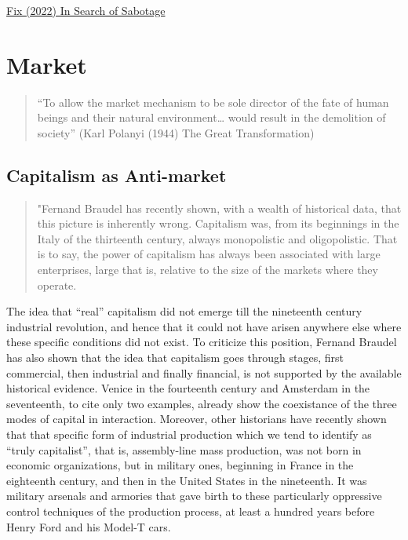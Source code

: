 \documentclass[
]{book}
\begin{document}
\href{https://economicsfromthetopdown.com/2022/03/11/in-search-of-sabotage/}{Fix (2022) In Search of Sabotage}

\hypertarget{market}{%
\chapter{Market}\label{market}}

\begin{quote}
``To allow the market mechanism to be sole director of the fate of human
beings and their natural environment\ldots{} would result in the demolition of
society'' (Karl Polanyi (1944) The Great Transformation)
\end{quote}

\hypertarget{capitalism-as-anti-market}{%
\section{Capitalism as Anti-market}\label{capitalism-as-anti-market}}

\begin{quote}
"Fernand Braudel has recently shown, with a wealth of historical data, that this picture is inherently wrong. Capitalism was, from its beginnings in the Italy of the thirteenth century, always monopolistic and oligopolistic. That is to say, the power of capitalism has always been associated with large enterprises, large that is, relative to the size of the markets where they operate.
\end{quote}

The idea that ``real'' capitalism did not emerge till the nineteenth century industrial revolution, and hence that it could not have arisen anywhere else where these specific conditions did not exist. To criticize this position, Fernand Braudel has also shown that the idea that capitalism goes through stages, first commercial, then industrial and finally financial, is not supported by the available historical evidence. Venice in the fourteenth century and Amsterdam in the seventeenth, to cite only two examples, already show the coexistance of the three modes of capital in interaction. Moreover, other historians have recently shown that that specific form of industrial production which we tend to identify as ``truly capitalist'', that is, assembly-line mass production, was not born in economic organizations, but in military ones, beginning in France in the eighteenth century, and then in the United States in the nineteenth. It was military arsenals and armories that gave birth to these particularly oppressive control techniques of the production process, at least a hundred years before Henry Ford and his Model-T cars.
\end{document}
